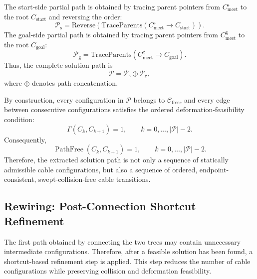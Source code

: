 \documentclass{pas}
\begin{document}
The start-side partial path is obtained by tracing parent pointers from
\(C_{\mathrm{meet}}^{\mathrm{s}}\) to the root \(C_{\mathrm{start}}\) and
reversing the order:
\begin{equation}
\mathcal{P}_{\mathrm{s}}
=
\mathrm{Reverse}
\left(
\mathrm{TraceParents}
\left(
C_{\mathrm{meet}}^{\mathrm{s}}
\rightarrow
C_{\mathrm{start}}
\right)
\right).
\label{eq:gcr_start_side_path}
\end{equation}
The goal-side partial path is obtained by tracing parent pointers from
\(C_{\mathrm{meet}}^{\mathrm{g}}\) to the root \(C_{\mathrm{goal}}\):
\begin{equation}
\mathcal{P}_{\mathrm{g}}
=
\mathrm{TraceParents}
\left(
C_{\mathrm{meet}}^{\mathrm{g}}
\rightarrow
C_{\mathrm{goal}}
\right).
\label{eq:gcr_goal_side_path}
\end{equation}
Thus, the complete solution path is
\begin{equation}
\mathcal{P}
=
\mathcal{P}_{\mathrm{s}}
\oplus
\mathcal{P}_{\mathrm{g}},
\label{eq:gcr_complete_path_concatenation}
\end{equation}
where \(\oplus\) denotes path concatenation.

By construction, every configuration in \(\mathcal{P}\) belongs to
\(\mathcal{C}_{\mathrm{free}}\), and every edge between consecutive
configurations satisfies the ordered deformation-feasibility condition:
\begin{equation}
\Gamma(C_k,C_{k+1})=1,
\qquad
k=0,\ldots,|\mathcal{P}|-2.
\label{eq:gcr_complete_path_ordered_feasibility}
\end{equation}
Consequently,
\begin{equation}
\operatorname{PathFree}(C_k,C_{k+1})=1,
\qquad
k=0,\ldots,|\mathcal{P}|-2.
\label{eq:gcr_complete_path_pathfree_feasibility}
\end{equation}
Therefore, the extracted solution path is not only a sequence of statically
admissible cable configurations, but also a sequence of ordered, endpoint-
consistent, swept-collision-free cable transitions.

\subsection{Rewiring: Post-Connection Shortcut Refinement}
\label{subsec:gcr_shortcut_refinement}

The first path obtained by connecting the two trees may contain unnecessary intermediate configurations. Therefore, after a feasible solution has been found, a shortcut-based refinement step is applied. This step reduces the number of cable configurations while preserving collision and deformation feasibility.
\end{document}
